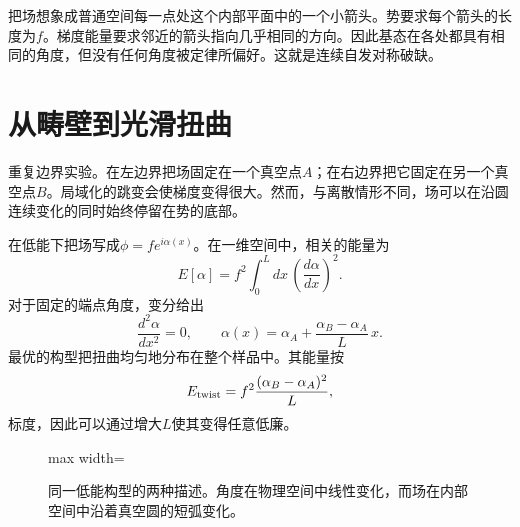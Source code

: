 把场想象成普通空间每一点处这个内部平面中的一个小箭头。势要求每个箭头的长度为\(f\)。梯度能量要求邻近的箭头指向几乎相同的方向。因此基态在各处都具有相同的角度，但没有任何角度被定律所偏好。这就是连续自发对称破缺。

\section{从畴壁到光滑扭曲}

重复边界实验。在左边界把场固定在一个真空点\(A\)；在右边界把它固定在另一个真空点\(B\)。局域化的跳变会使梯度变得很大。然而，与离散情形不同，场可以在沿圆连续变化的同时始终停留在势的底部。

在低能下把场写成\(\phi=f e^{i\alpha(x)}\)。在一维空间中，相关的能量为
\begin{equation}
  E[\alpha]
  =f^2\int_0^L dx\,\left(\frac{d\alpha}{dx}\right)^2.
  \label{eq:l07-angle-functional}
\end{equation}
对于固定的端点角度，变分给出
\begin{equation}
  \frac{d^2\alpha}{dx^2}=0,
  \qquad
  \alpha(x)=\alpha_A+
    \frac{\alpha_B-\alpha_A}{L}\,x.
  \label{eq:l07-linear-twist}
\end{equation}
最优的构型把扭曲均匀地分布在整个样品中。其能量按
\begin{equation}
  E_{\rm twist}
  =f^2\frac{(\alpha_B-\alpha_A)^2}{L},
  \label{eq:l07-twist-energy}
\end{equation}
标度，因此可以通过增大\(L\)使其变得任意低廉。

\begin{figure}[htbp]
\centering
\begin{adjustbox}{max width=\linewidth}
\end{adjustbox}
\caption{同一低能构型的两种描述。角度在物理空间中线性变化，而场在内部空间中沿着真空圆的短弧变化。}
\end{figure}

